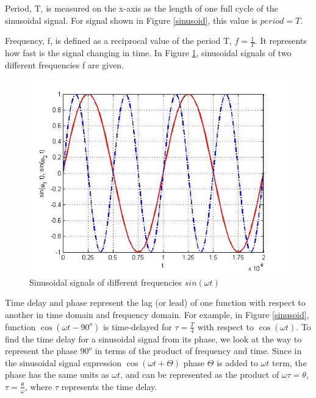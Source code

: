 \documentclass{ximera}
\begin{document}
\begin{definition}
Period, T, is measured on the x-axis as the length of one full cycle of the sinusoidal signal. For signal shown in Figure \ref{sinusoid}, this value is $period=T$. 
\end{definition}

\begin{definition}
Frequency, f,  is defined as a reciprocal value of the period T, $f=\frac{1}{T}$. It represents how fast is the signal changing in time.  In Figure \ref{sinF1F2}, sinusoidal signals of two different frequencies f are given. 

\begin{figure}[htbp]
\includegraphics[scale=0.4]{jpg/cpef6.jpg}
\caption{Sinusoidal signals of different frequencies $sin ( \omega t)$}
\label{sinF1F2}
\end{figure}

\end{definition}

\begin{definition}
Time delay and phase represent the lag (or lead) of one function with respect to another in time domain and frequency domain. For example, in Figure \ref{sinusoid}, function $ \cos(\omega t - 90^o)$ is time-delayed for $\tau = \frac{T}{4}$ with respect to $\cos (\omega t)$. To find the time delay for a sinusoidal signal from its phase, we look at the way to represent the phase $90^o$ in terms of the product of frequency and time. Since in the sinusoidal signal expression $\cos (\omega t + \Theta)$  phase $\Theta$ is added to $\omega t$ term, the phase has the same units as $\omega t$, and can be represented as the product of $\omega \tau = \theta$, $\tau = \frac{\theta}{\omega}$, where $\tau$ represents the time delay.
\end{definition}
\end{document}
